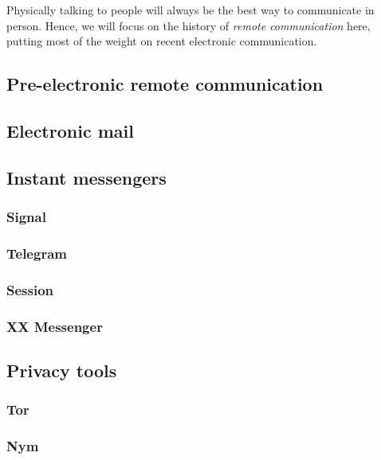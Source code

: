 \documentclass[sigconf, nonacm, balance=false, natbib=false]{acmart}
\begin{document}
Physically talking to people will always be the best way to communicate in person. Hence, we will focus on the history of \textit{remote communication} here, putting most of the weight on recent electronic communication.

\subsection{Pre-electronic remote communication}

\subsection{Electronic mail}

\subsection{Instant messengers}

\subsubsection{Signal}

\subsubsection{Telegram}

\subsubsection{Session}

\subsubsection{XX Messenger}

\subsection{Privacy tools}

\subsubsection{Tor}

\subsubsection{Nym}


\printbibliography
\end{document}
